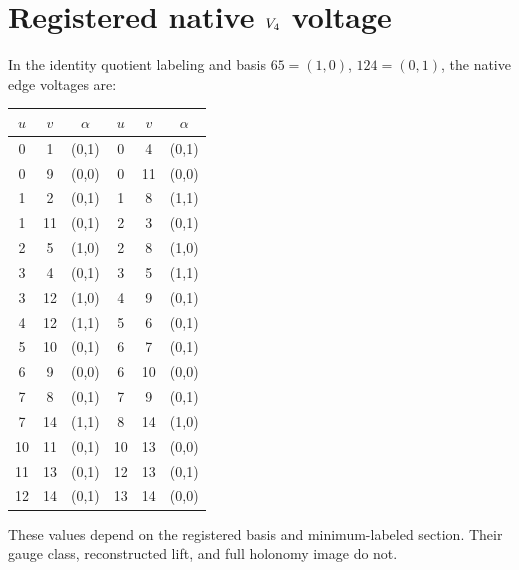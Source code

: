 \section{Registered native \(V_{4}\) voltage}

In the identity quotient labeling and basis
\(65=(1,0)\), \(124=(0,1)\), the native edge voltages are:

\begin{longtable}{c@{\(\,--\,\)}c c@{\qquad}c@{\(\,--\,\)}c c}
\toprule
\(u\)&\(v\)&\(\alpha\)&\(u\)&\(v\)&\(\alpha\)\\
\midrule
\endhead
0&1&(0,1)&0&4&(0,1)\\
0&9&(0,0)&0&11&(0,0)\\
1&2&(0,1)&1&8&(1,1)\\
1&11&(0,1)&2&3&(0,1)\\
2&5&(1,0)&2&8&(1,0)\\
3&4&(0,1)&3&5&(1,1)\\
3&12&(1,0)&4&9&(0,1)\\
4&12&(1,1)&5&6&(0,1)\\
5&10&(0,1)&6&7&(0,1)\\
6&9&(0,0)&6&10&(0,0)\\
7&8&(0,1)&7&9&(0,1)\\
7&14&(1,1)&8&14&(1,0)\\
10&11&(0,1)&10&13&(0,0)\\
11&13&(0,1)&12&13&(0,1)\\
12&14&(0,1)&13&14&(0,0)\\
\bottomrule
\end{longtable}

These values depend on the registered basis and minimum-labeled
section.  Their gauge class, reconstructed lift, and full holonomy
image do not.
